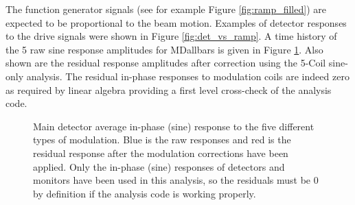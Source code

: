 The function generator signals (see for example Figure \ref{fig:ramp_filled}) are expected to be proportional to the beam motion. Examples of detector responses to the drive signals were shown in Figure \ref{fig:det_vs_ramp}. A time history of the 5 raw sine response amplitudes for MDallbars is given in Figure \ref{fig:sine_only_res}. Also shown are the residual response amplitudes after correction using the 5-Coil sine-only analysis. The residual in-phase responses to modulation coils are indeed zero as required by linear algebra providing a first level cross-check of the analysis code.
\begin{figure}[h]

\centering
{}
\caption{Main detector average in-phase (sine) response to the five different types of modulation. Blue is the raw responses and red is the residual response after the modulation corrections have been applied. Only the in-phase (sine) responses of detectors and monitors have been used in this analysis, so the residuals must be 0 by definition if the analysis code is working properly.}
\label{fig:sine_only_res}
\end{figure}


